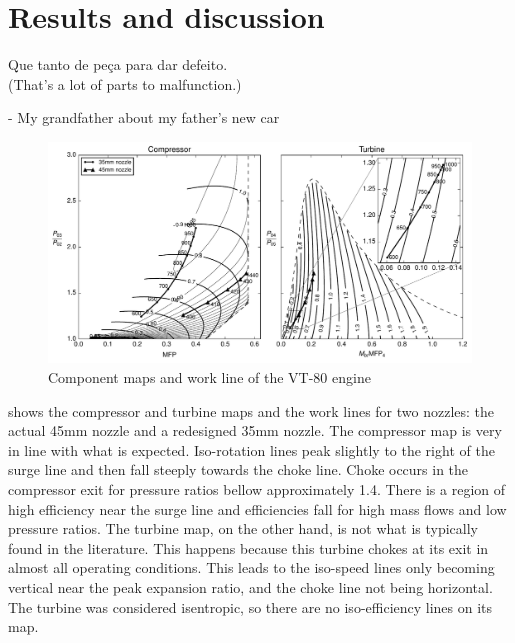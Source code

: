 \chapter{Results and discussion}
\label{sec:results}
\epigraph{Que tanto de peça para dar defeito.\\{\footnotesize (That's a lot of parts to malfunction.)}}{- My grandfather about my father's new car}

\begin{figure}
    \AddThispageHook{\thispagestyle{empty}}
    \caption{Component maps and work line of the VT-80 engine}
    \label{fig:wline}
\includegraphics{fig/wline.pdf}
\end{figure}


 shows the compressor and turbine maps and the work lines for
two nozzles: the actual 45mm nozzle and a redesigned 35mm nozzle.  The
compressor map is very in line with what is expected. Iso-rotation lines peak
slightly to the right of the surge line and then fall steeply towards the choke
line. Choke occurs in the compressor exit for pressure ratios bellow
approximately 1.4. There is a region of high efficiency near the surge line and
efficiencies fall for high mass flows and low pressure ratios. The turbine map,
on the other hand, is not what is typically found in the literature. This
happens because this turbine chokes at its exit in almost all operating
conditions. This leads to the iso-speed lines only becoming vertical near the
peak expansion ratio, and the choke line not being horizontal. 
The turbine was considered isentropic, so there are no iso-efficiency lines on its map.

